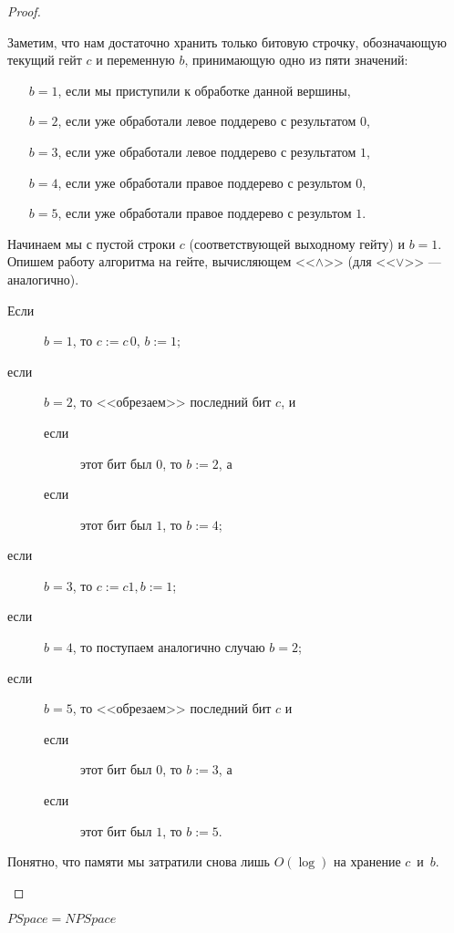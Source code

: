 \begin{proof}
\begin{enumerate}
	{\small
	Заметим, что нам достаточно хранить только битовую строчку,
	обозначающую текущий гейт $c$ и переменную $b$, принимающую одно из пяти значений:
	\begin{enumerate}
	\item[$b=1$,] \leftskip 3mm
              если мы приступили к обработке данной вершины, 
	\item[$b=2$,] если уже обработали левое поддерево с результатом $0$,
	\item[$b=3$,] если уже обработали левое поддерево с результатом $1$,
	\item[$b=4$,] если уже обработали правое поддерево с результом $0$,
	\item[$b=5$,] если уже обработали правое поддерево с результом $1$.
	\end{enumerate}
	Начинаем мы с пустой строки $c$ (соответствующей выходному гейту)
	и $b=1$. Опишем работу алгоритма на гейте, вычисляющем <<$\land$>> 
	(для <<$\lor$>> --- аналогично). 

		\begin{description}
		\item[Если] $b=1$, то $c:=c\,0$, $b:=1$;	
		\item[если] $b=2$, то <<обрезаем>> последний бит $c$, и 
			\begin{description}
			\item[если] этот бит был $0$, то $b:=2$, а
			\item[если] этот бит был $1$, то $b:=4$;
			\end{description}
		\item[если] $b=3$, то $c:=c1, b:=1$;
		\item[если] $b=4$, то поступаем аналогично случаю $b=2$;
		\item[если] $b=5$, то <<обрезаем>> последний бит $c$ и
	\begin{description}
	\item[если] этот бит был $0$, то $b:=3$, а
	\item[если] этот бит был $1$, то $b:=5$.
	\end{description}
\end{description}
Понятно, что памяти мы затратили снова лишь $O(\log)$ на хранение $c$~и~$b$.
}
\end{enumerate}
\end{proof}

\begin{conseq}                                          	
	$PSpace = NPSpace$\\
\end{conseq}

